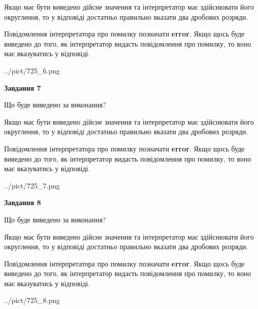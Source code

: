 \documentclass[12pt, ukrainian]{article}
\begin{document}
{\begin {Large}
Якщо має бути виведено дійсне значення та інтерпретатор має здійснювати його округлення, 
то у відповіді достатньо правильно вказати два дробових розряди.

Повідомлення інтерпретатора про помилку позначати \textbf{error}.
Якщо щось буде виведено до того, як інтерпретатор видасть повідомлення про помилку, 
то воно має вказуватись у відповіді. \par

\begin{center}
	{../pict/725_6.png}
\end{center}
\newpage

{\begin {center}\textbf{Завдання 7}\end {center}}\par
Що буде виведено за виконання? \par

Якщо має бути виведено дійсне значення та інтерпретатор має здійснювати його округлення, 
то у відповіді достатньо правильно вказати два дробових розряди.

Повідомлення інтерпретатора про помилку позначати \textbf{error}.
Якщо щось буде виведено до того, як інтерпретатор видасть повідомлення про помилку, 
то воно має вказуватись у відповіді. \par

\begin{center}
	{../pict/725_7.png}
\end{center}
\newpage

{\begin {center}\textbf{Завдання 8}\end {center}}\par
Що буде виведено за виконання? \par

Якщо має бути виведено дійсне значення та інтерпретатор має здійснювати його округлення, 
то у відповіді достатньо правильно вказати два дробових розряди.

Повідомлення інтерпретатора про помилку позначати \textbf{error}.
Якщо щось буде виведено до того, як інтерпретатор видасть повідомлення про помилку, 
то воно має вказуватись у відповіді. \par

\begin{center}
	{../pict/725_8.png}
\end{center}
\newpage


\end{Large}}
\end{document}

